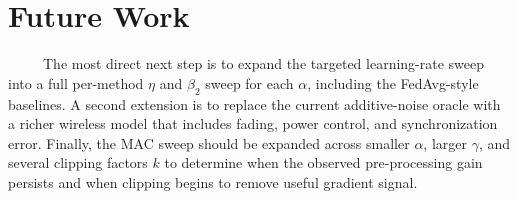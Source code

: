 \section{Future Work}
\label{sec:future-work}
\ \ \ \ \, The most direct next step is to expand the targeted
learning-rate sweep into a full per-method $\eta$ and $\beta_2$ sweep for
each $\alpha$, including the FedAvg-style baselines. A second extension is
to replace the current additive-noise oracle with a richer wireless model
that includes fading, power control, and synchronization error. Finally, the
MAC sweep should be expanded across smaller $\alpha$, larger $\gamma$, and
several clipping factors $k$ to determine when the observed pre-processing
gain persists and when clipping begins to remove useful gradient signal.
